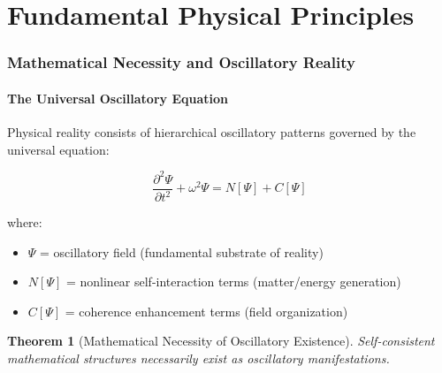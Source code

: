\documentclass[12pt,a4paper]{article}
\newtheorem{theorem}{Theorem}[section]
\theoremstyle{remark}
\begin{document}
\begin{abstract}
The framework reveals the ultimate physical paradox: **Perfect Functionality + Unknowable Mechanism = Operational Indeterminacy**. Reality operates with perfect computational efficiency yet the fundamental mechanism (zero computation navigation vs. infinite computation processing) remains forever unknowable to embedded physical systems, creating fundamental uncertainty about operational methodology despite flawless performance.

\textbf{Keywords:} oscillatory reality, universal problem-solving, temporal predetermination, zero computation, photon simultaneity, ping-pong FTL, KLA cascade instant travel, reference frame propagation, implication-based physics, electromagnetic propulsion, naked engines, analytical chemistry, S Stella constant
\end{abstract}

\tableofcontents

\part{Fundamental Physical Principles}

\section{Mathematical Necessity and Oscillatory Reality}

\subsection{The Universal Oscillatory Equation}

Physical reality consists of hierarchical oscillatory patterns governed by the universal equation:

\begin{equation}
\frac{\partial^2\Psi}{\partial t^2} + \omega^2\Psi = N[\Psi] + C[\Psi]
\label{eq:universal_oscillatory}
\end{equation}

where:
\begin{itemize}
\item $\Psi$ = oscillatory field (fundamental substrate of reality)
\item $N[\Psi]$ = nonlinear self-interaction terms (matter/energy generation)
\item $C[\Psi]$ = coherence enhancement terms (field organization)
\end{itemize}

\begin{theorem}[Mathematical Necessity of Oscillatory Existence]
Self-consistent mathematical structures necessarily exist as oscillatory manifestations.
\end{theorem}
\end{document}

